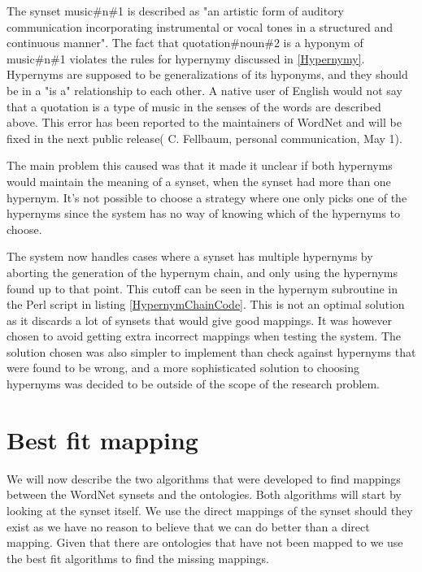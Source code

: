 The synset music\#n\#1 is described as "an artistic form of auditory communication incorporating instrumental or vocal tones in a structured and continuous manner".
The fact that quotation\#noun\#2 is a hyponym of music\#n\#1 violates the rules for hypernymy discussed in \ref{Hypernymy}.
Hypernyms are supposed to be generalizations of its hyponyms,
and they should be in a "is a" relationship to each other.
A native user of English would not say that a quotation is a type of music in the senses of the words are described above.
This error has been reported to the maintainers of WordNet and will be fixed in the next public release( C. Fellbaum, personal communication, May 1).

The main problem this caused was that it made it unclear if both hypernyms would maintain the meaning of a synset,
when the synset had more than one hypernym.
It's not possible to choose a strategy where one only picks one of the hypernyms since the system has no way of
knowing which of the hypernyms to choose.

The system now handles cases where a synset has multiple hypernyms by aborting the generation of the hypernym chain,
and only using the hypernyms found up to that point.
This cutoff can be seen in the hypernym subroutine in the Perl script in listing \ref{HypernymChainCode}.
This is not an optimal solution as it discards a lot of synsets that would give good mappings.
It was however chosen to avoid getting extra incorrect mappings when testing the system.
The solution chosen was also simpler to implement than check against hypernyms that were found to be wrong,
and a more sophisticated solution to choosing hypernyms was decided to be outside of the scope of the research problem.

\section{Best fit mapping}
\label{BestFitMapping}
We will now describe the two algorithms that were developed to find mappings between the WordNet synsets and the ontologies.
Both algorithms will start by looking at the synset itself.
We use the direct mappings of the synset should they exist as we have no reason to believe that we can do better than a
direct mapping.
Given that there are ontologies that have not been mapped to we use the best fit algorithms to find the missing mappings.

